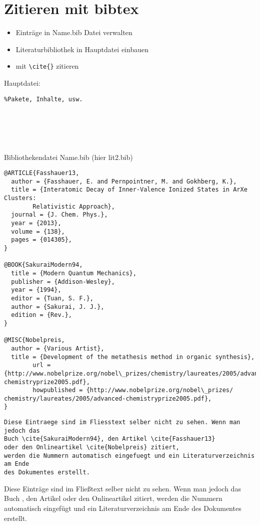 \section{Zitieren mit bibtex}

\begin{itemize}
 \item Einträge in Name.bib Datei verwalten
 \item Literaturbibliothek in Hauptdatei einbauen
 \item mit \lstinline$\cite{}$ zitieren
\end{itemize}

Hauptdatei:
\begin{lstlisting}
%Pakete, Inhalte, usw.






\end{lstlisting}

Bibliothekendatei Name.bib (hier lit2.bib)
\begin{lstlisting}
@ARTICLE{Fasshauer13,
  author = {Fasshauer, E. and Pernpointner, M. and Gokhberg, K.},
  title = {Interatomic Decay of Inner-Valence Ionized States in ArXe Clusters:
        Relativistic Approach},
  journal = {J. Chem. Phys.},
  year = {2013},
  volume = {138},
  pages = {014305},
}

@BOOK{SakuraiModern94,
  title = {Modern Quantum Mechanics},
  publisher = {Addison-Wesley},
  year = {1994},
  editor = {Tuan, S. F.},
  author = {Sakurai, J. J.},
  edition = {Rev.},
}

@MISC{Nobelpreis,
  author = {Various Artist},
  title = {Development of the metathesis method in organic synthesis},
        url = {http://www.nobelprize.org/nobel\_prizes/chemistry/laureates/2005/advanced-chemistryprize2005.pdf},
        howpublished = {http://www.nobelprize.org/nobel\_prizes/ chemistry/laureates/2005/advanced-chemistryprize2005.pdf},
}
\end{lstlisting}

\begin{lstlisting}
Diese Eintraege sind im Fliesstext selber nicht zu sehen. Wenn man jedoch das
Buch \cite{SakuraiModern94}, den Artikel \cite{Fasshauer13} 
oder den Onlineartikel \cite{Nobelpreis} zitiert,
werden die Nummern automatisch eingefuegt und ein Literaturverzeichnis am Ende
des Dokumentes erstellt.
\end{lstlisting}

Diese Einträge sind im Fließtext selber nicht zu sehen. Wenn man jedoch das
Buch \cite{SakuraiModern94}, den Artikel \cite{Fasshauer13} oder den
Onlineartikel \cite{Nobelpreis} zitiert,
werden die Nummern automatisch eingefügt und ein Literaturverzeichnis am Ende
des Dokumentes erstellt.

